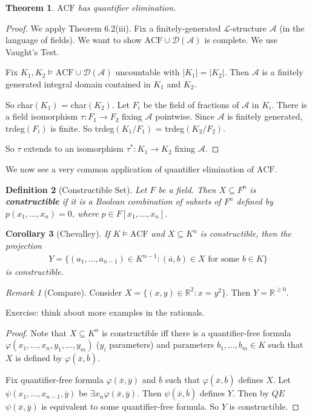 \documentclass[]{article}
\theoremstyle{custhm}
\newtheorem{theorem}{Theorem}[section]
\theoremstyle{cusdef}
\newtheorem{defin}[theorem]{Definition}
\theoremstyle{custhm}
\theoremstyle{custhm}
\newtheorem{cor}[theorem]{Corollary}
\theoremstyle{custhm}
\theoremstyle{ex}
\theoremstyle{custhm}
\theoremstyle{cusdef}
\theoremstyle{remark}
\newtheorem*{remark*}{Remark}
\theoremstyle{remark}
\newcommand{\R}{\mathbb{R}}
\newcommand{\ra}{\rightarrow}
\newcommand{\undf}[1]{\textit{\textbf{#1}}}
\renewcommand{\L}{\mathcal{L}}
\renewcommand{\phi}{\varphi}
\renewcommand{\bar}{\overline}
\newcommand{\acf}{\textrm{ACF}}
\newcommand{\A}{\mathcal{A}}
\newcommand{\D}{\mathcal{D}}
\renewcommand{\subset}{\subseteq}
\begin{document}
\begin{theorem}
$\acf$ has quantifier elimination.
\end{theorem}
\begin{proof}
We apply Theorem 6.2(iii). Fix a finitely-generated $\L$-structure $\A$ (in the language of fields). We want to show $\acf\cup \D(\A)$ is complete. We use Vaught's Test.

Fix $K_1,K_2\models\acf\cup \D(\A)$ uncountable with $|K_1| = |K_2|$. Then $\A$ is a finitely generated integral domain contained in $K_1$ and $K_2$.

So char$(K_1)$ = char\((K_2)\). Let $F_i$ be the field of fractions of $\A$ in $K_i$. There is a field isomorphism $\tau : F_1\ra F_2$ fixing $\A$ pointwise. Since $\A$ is finitely generated, trdeg$(F_i)$ is finite. So trdeg$(K_1/F_1)$ = trdeg$(K_2/F_2)$.

So $\tau$ extends to an isomorphism $\tau^\ast: K_1\ra K_2$ fixing $\A$.
\end{proof}
We now see a very common application of quantifier elimination of $\acf$.

\begin{defin}[Constructible Set]
Let $F$ be a field. Then $X\subset F^n$ is \undf{constructible} if it is a Boolean combination of subsets of $F^n$ defined by $p(x_1,\dots,x_n) = 0$, where $p \in F[x_1,\dots,x_n]$.
\end{defin}
\begin{cor}[Chevalley]
If $K\models \acf$ and $X\subset K^n$ is constructible, then the projection
\begin{align*}
Y = \{(a_1,\dots,a_{n-1})\in K^{n-1}:(\overline{a},b)\in X\textrm{ for some }b\in K\}
\end{align*}
is constructible.
\end{cor}

\begin{remark*}[Compare]
Consider $X = \{(x,y)\in \R^2:x = y^2\}$. Then $Y = \R^{\ge 0}$.

Exercise: think about more examples in the rationals.
\end{remark*}
\begin{proof}
Note that $X\subset K^n$ is constructible iff there is a quantifier-free formula $\phi(x_1,\dots,x_n,y_1,\dots,y_m)$ ($y_i$ parameters) and parameters $b_1,\dots,b_m\in K$ such that $X$ is defined by $\phi(\bar{x},\bar{b})$.

Fix quantifier-free formula $\phi(\bar{x},\bar{y})$ and $\bar{b}$ such that $\phi(\bar{x},\bar{b})$ defines $X$. Let $\psi(x_1,\dots,x_{n-1},\bar{y})$ be $\exists x_n\phi(\bar{x},\bar{y})$. Then $\psi(\bar{x},\bar{b})$ defines $Y$. Then by $QE$ $\psi(\bar{x},\bar{y})$ is equivalent to some quantifier-free formula. So $Y$ is constructible.
\end{proof}
\end{document}
